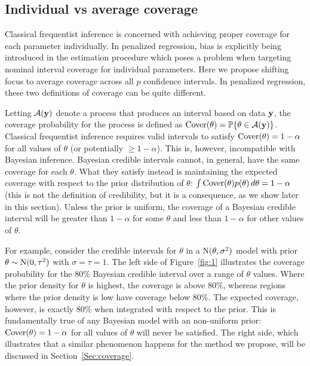 \subsection{Individual vs average coverage}
\label{Sec:IAC}

Classical frequentist inference is concerned with achieving proper coverage for each parameter individually. In penalized regression, bias is explicitly being introduced in the estimation procedure which poses a problem when targeting nominal interval coverage for individual parameters. Here we propose shifting focus to average coverage across all $p$ confidence intervals. In penalized regression, these two definitions of coverage can be quite different.

Letting $\mathcal{A}(\mathbf{y})$ denote a process that produces an interval based on data $\mathbf{y}$, the coverage probability for the process is defined as $\textrm{Cover}(\theta) = \mathbb{P}\{\theta \in \mathcal{A}(\mathbf{y})\}$. Classical frequentist inference requires valid intervals to satisfy $\textrm{Cover}(\theta) = 1 - \alpha$ for all values of $\theta$ (or potentially $\ge 1 - \alpha$). This is, however, incompatible with Bayesian inference. Bayesian credible intervals cannot, in general, have the same coverage for each $\theta$. What they satisfy instead is maintaining the expected coverage with respect to the prior distribution of $\theta$: $\int \textrm{Cover}(\theta)p(\theta) \, d\theta = 1 - \alpha$ (this is not the definition of credibility, but it is a consequence, as we show later in this section). Unless the prior is uniform, the coverage of a Bayesian credible interval will be greater than $1-\alpha$ for some $\theta$ and less than $1-\alpha$ for other values of $\theta$.

For example, consider the credible intervals for $\theta$ in a $\textrm{N}(\theta, \sigma^2)$ model with prior $\theta \sim \textrm{N}(0, \tau^2)$ with $\sigma = \tau = 1$. The left side of Figure~\ref{fig:1} illustrates the coverage probability for the 80\% Bayesian credible interval over a range of $\theta$ values. Where the prior density for $\theta$ is highest, the coverage is above 80\%, whereas regions where the prior density is low have coverage below 80\%. The expected coverage, however, is exactly 80\% when integrated with respect to the prior. This is fundamentally true of any Bayesian model with an non-uniform prior: $\textrm{Cover}(\theta) = 1 - \alpha$ for all values of $\theta$ will never be satisfied. The right side, which illustrates that a similar phenomenon happens for the method we propose, will be discussed in Section~\ref{Sec:coverage}.

